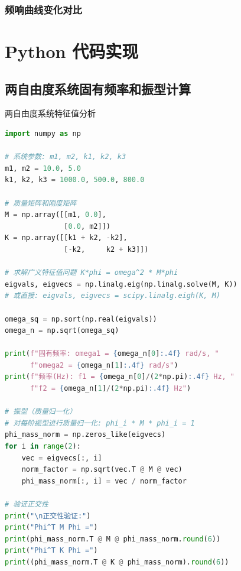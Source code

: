 \subsubsection{频响曲线变化对比}


\section{Python 代码实现}

\subsection{两自由度系统固有频率和振型计算}

\begin{mycode}{两自由度系统特征值分析}
\begin{lstlisting}[language=Python]
import numpy as np

# 系统参数: m1, m2, k1, k2, k3
m1, m2 = 10.0, 5.0
k1, k2, k3 = 1000.0, 500.0, 800.0

# 质量矩阵和刚度矩阵
M = np.array([[m1, 0.0],
              [0.0, m2]])
K = np.array([[k1 + k2, -k2],
              [-k2,     k2 + k3]])

# 求解广义特征值问题 K*phi = omega^2 * M*phi
eigvals, eigvecs = np.linalg.eig(np.linalg.solve(M, K))
# 或直接: eigvals, eigvecs = scipy.linalg.eigh(K, M)

omega_sq = np.sort(np.real(eigvals))
omega_n = np.sqrt(omega_sq)

print(f"固有频率: omega1 = {omega_n[0]:.4f} rad/s, "
      f"omega2 = {omega_n[1]:.4f} rad/s")
print(f"频率(Hz): f1 = {omega_n[0]/(2*np.pi):.4f} Hz, "
      f"f2 = {omega_n[1]/(2*np.pi):.4f} Hz")

# 振型（质量归一化）
# 对每阶振型进行质量归一化: phi_i * M * phi_i = 1
phi_mass_norm = np.zeros_like(eigvecs)
for i in range(2):
    vec = eigvecs[:, i]
    norm_factor = np.sqrt(vec.T @ M @ vec)
    phi_mass_norm[:, i] = vec / norm_factor

# 验证正交性
print("\n正交性验证:")
print("Phi^T M Phi =")
print(phi_mass_norm.T @ M @ phi_mass_norm.round(6))
print("Phi^T K Phi =")
print((phi_mass_norm.T @ K @ phi_mass_norm).round(6))
\end{lstlisting}
\end{mycode}

